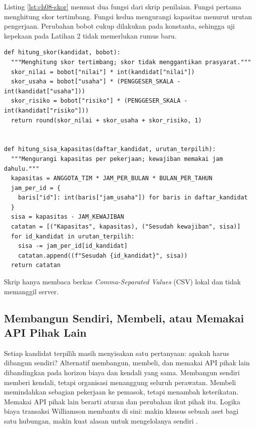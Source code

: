 \begin{pendalaman}[title={Pendalaman Teknis (opsional): Menghitung Skor dan Sisa Kapasitas}]
Listing \ref{lst:ch08-skor} memuat dua fungsi dari skrip penilaian. Fungsi pertama menghitung skor tertimbang. Fungsi kedua mengurangi kapasitas
menurut urutan pengerjaan. Perubahan bobot cukup dilakukan pada konstanta, sehingga uji kepekaan pada Latihan 2 tidak memerlukan rumus baru.

\begin{lstlisting}[style=ch08python, caption={Menghitung skor dan sisa kapasitas, tersedia di \berkas{sources/chapter08/hitung-prioritas-portofolio.py}}, label={lst:ch08-skor}]
def hitung_skor(kandidat, bobot):
  """Menghitung skor tertimbang; skor tidak menggantikan prasyarat."""
  skor_nilai = bobot["nilai"] * int(kandidat["nilai"])
  skor_usaha = bobot["usaha"] * (PENGGESER_SKALA - int(kandidat["usaha"]))
  skor_risiko = bobot["risiko"] * (PENGGESER_SKALA - int(kandidat["risiko"]))
  return round(skor_nilai + skor_usaha + skor_risiko, 1)


def hitung_sisa_kapasitas(daftar_kandidat, urutan_terpilih):
  """Mengurangi kapasitas per pekerjaan; kewajiban memakai jam dahulu."""
  kapasitas = ANGGOTA_TIM * JAM_PER_BULAN * BULAN_PER_TAHUN
  jam_per_id = {
    baris["id"]: int(baris["jam_usaha"]) for baris in daftar_kandidat
  }
  sisa = kapasitas - JAM_KEWAJIBAN
  catatan = [("Kapasitas", kapasitas), ("Sesudah kewajiban", sisa)]
  for id_kandidat in urutan_terpilih:
    sisa -= jam_per_id[id_kandidat]
    catatan.append((f"Sesudah {id_kandidat}", sisa))
  return catatan
\end{lstlisting}

Skrip hanya membaca berkas \textit{Comma-Separated Values} (CSV) lokal dan tidak memanggil server.
\end{pendalaman}

\subsection{Membangun Sendiri, Membeli, atau Memakai API Pihak Lain}

Setiap kandidat terpilih masih menyisakan satu pertanyaan: apakah harus dibangun sendiri? Alternatif membangun, membeli, dan memakai API pihak lain
dibandingkan pada horizon biaya dan kendali yang sama. Membangun sendiri memberi kendali, tetapi organisasi menanggung seluruh perawatan. Membeli
memindahkan sebagian pekerjaan ke pemasok, tetapi menambah keterikatan. Memakai API pihak lain berarti aturan dan perubahan ikut pihak itu. Logika
biaya transaksi Williamson membantu di sini: makin khusus sebuah aset bagi satu hubungan, makin kuat alasan untuk mengelolanya sendiri
\cite{c08-williamson1981}.

